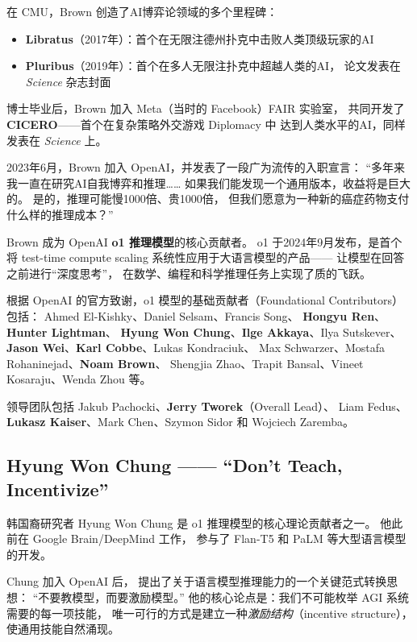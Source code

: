 在 CMU，Brown 创造了AI博弈论领域的多个里程碑：
\begin{itemize}[noitemsep]
  \item \textbf{Libratus}（2017年）：首个在无限注德州扑克中击败人类顶级玩家的AI
  \item \textbf{Pluribus}（2019年）：首个在多人无限注扑克中超越人类的AI，
        论文发表在 \emph{Science} 杂志封面
\end{itemize}

博士毕业后，Brown 加入 Meta（当时的 Facebook）FAIR 实验室，
共同开发了 \textbf{CICERO}——首个在复杂策略外交游戏 Diplomacy 中
达到人类水平的AI，同样发表在 \emph{Science} 上。

2023年6月，Brown 加入 OpenAI，并发表了一段广为流传的入职宣言：
``多年来我一直在研究AI自我博弈和推理……
如果我们能发现一个通用版本，收益将是巨大的。
是的，推理可能慢1000倍、贵1000倍，
但我们愿意为一种新的癌症药物支付什么样的推理成本？''

Brown 成为 OpenAI \textbf{o1 推理模型}的核心贡献者。
o1 于2024年9月发布，是首个将 test-time compute scaling
系统性应用于大语言模型的产品——
让模型在回答之前进行``深度思考''，
在数学、编程和科学推理任务上实现了质的飞跃。

\begin{corebox}[o1 团队的关键人物]
根据 OpenAI 的官方致谢，o1 模型的基础贡献者（Foundational Contributors）包括：
Ahmed El-Kishky、Daniel Selsam、Francis Song、
\textbf{Hongyu Ren}、\textbf{Hunter Lightman}、
\textbf{Hyung Won Chung}、\textbf{Ilge Akkaya}、Ilya Sutskever、
\textbf{Jason Wei}、\textbf{Karl Cobbe}、Lukas Kondraciuk、
Max Schwarzer、Mostafa Rohaninejad、\textbf{Noam Brown}、
Shengjia Zhao、Trapit Bansal、Vineet Kosaraju、Wenda Zhou 等。

领导团队包括 Jakub Pachocki、\textbf{Jerry Tworek}（Overall Lead）、
Liam Fedus、\textbf{Lukasz Kaiser}、Mark Chen、Szymon Sidor 和 Wojciech Zaremba。
\end{corebox}


\subsection{Hyung Won Chung —— ``Don't Teach, Incentivize''}
\label{subsec:hyung-won-chung}

韩国裔研究者 Hyung Won Chung 是 o1 推理模型的核心理论贡献者之一。
他此前在 Google Brain/DeepMind 工作，
参与了 Flan-T5 和 PaLM 等大型语言模型的开发。

Chung 加入 OpenAI 后，
提出了关于语言模型推理能力的一个关键范式转换思想：
``不要教模型，而要激励模型。''
他的核心论点是：我们不可能枚举 AGI 系统需要的每一项技能，
唯一可行的方式是建立一种\emph{激励结构}（incentive structure），
使通用技能自然涌现。

